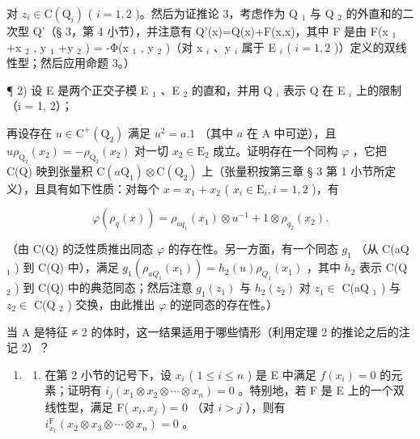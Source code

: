 对 \(z_{i}\in\mathrm{C}(\mathrm{Q}_{i})\) ( \(i=1,2\) )。然后为证推论 3，考虑作为 Q \(_{1}\) 与 Q \(_{2}\) 的外直和的二次型 Q'（§ 3，第 4 小节），并注意有 Q'(x)=Q(x)+F(x,x)，其中 F 是由 F(x \(_{1}\) +x \(_{2}\) , y \(_{1}\) +y \(_{2}\) ) = -Φ(x \(_{1}\) , y \(_{2}\) )（对 x \(_{i}\) 、y \(_{i}\) 属于 E \(_{i}\) ( \(i=1,2\) )）定义的双线性型；然后应用命题 3。）

¶ 2) 设 E 是两个正交子模 E \(_{1}\) 、E \(_{2}\) 的直和，并用 Q \(_{i}\) 表示 Q 在 E \(_{i}\) 上的限制（i = 1, 2）；

再设存在 \(u \in \mathrm{C}^{+}(\mathrm{Q}_{2})\) 满足 \(u^{2} = a.1\) （其中 \(a\) 在 A 中可逆），且 \(u\rho_{\mathrm{Q}_{2}}(x_{2}) = -\rho_{\mathrm{Q}_{2}}(x_{2})\) 对一切 \(x_{2} \in \mathrm{E}_{2}\) 成立。证明存在一个同构 \(\varphi\) ，它把 C(Q) 映到张量积 \(\mathrm{C}(a\mathrm{Q}_{1}) \otimes \mathrm{C}(\mathrm{Q}_{2})\) 上（张量积按第三章 § 3 第 1 小节所定义），且具有如下性质：对每个 \(x = x_{1} + x_{2}\) ( \(x_{i} \in \mathrm{E}_{i}, i = 1, 2\) )，有

\[
\varphi (\rho_ {q} (x)) = \rho_ {a q _ {1}} (x _ {1}) \otimes u ^ {- 1} + 1 \otimes \rho_ {q _ {2}} (x _ {2}).
\]

（由 C(Q) 的泛性质推出同态 \(\varphi\) 的存在性。另一方面，有一个同态 \(g_{1}\) （从 C(aQ \(_{1}\) ) 到 C(Q) 中），满足 \(g_{1}(\rho_{aQ_{1}}(x_{1})) = h_{2}(u)\rho_{Q_{1}}(x_{1})\) ，其中 \(h_{2}\) 表示 C(Q \(_{2}\) ) 到 C(Q) 中的典范同态；然后注意 \(g_{1}(z_{1})\) 与 \(h_{2}(z_{2})\) 对 \(z_{1} \in\) C(aQ \(_{1}\) ) 与 \(z_{2} \in\) C(Q \(_{2}\) ) 交换，由此推出 \(\varphi\) 的逆同态的存在性。）

当 A 是特征 ≠ 2 的体时，这一结果适用于哪些情形（利用定理 2 的推论之后的注记 2）？

\begin{enumerate}
\def\labelenumi{\arabic{enumi})}
\setcounter{enumi}{2}
\tightlist
\item
  \begin{enumerate}
  \def\labelenumii{\alph{enumii})}
  \tightlist
  \item
    在第 2 小节的记号下，设 \(x_{i}\) ( \(1 \leqslant i \leqslant n\) ) 是 E 中满足 \(f(x_{i}) = 0\) 的元素；证明有 \(i_{j}(x_{1} \otimes x_{2} \otimes \cdots \otimes x_{n}) = 0\) 。特别地，若 F 是 E 上的一个双线性型，满足 F( \(x_{i}, x_{j}\) ) = 0 （对 \(i > j\) ），则有 \(i_{x_{1}}^{\mathrm{F}}(x_{2} \otimes x_{3} \otimes \cdots \otimes x_{n}) = 0\) 。
  \end{enumerate}
\end{enumerate}

